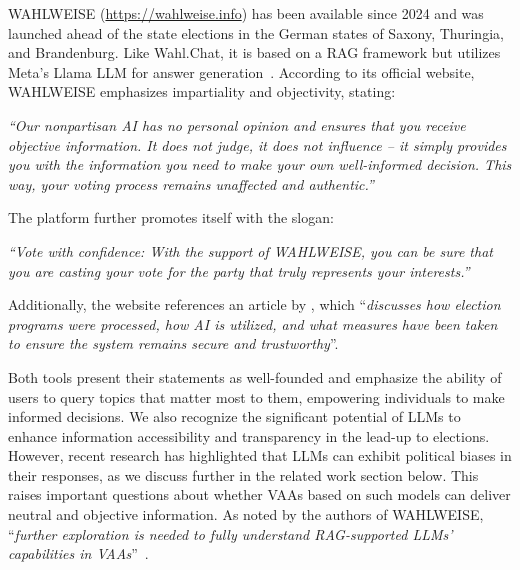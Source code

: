 \documentclass[
	fontsize=10pt,          %
	numbers=noenddot,    	%
    parskip=half,        	%
    listof=totoc,        	%
    bibliography=totoc,  	%
	headsepline=true,       %
	footsepline=false, 		%
    DIV=12                	%
]{scrartcl}
\begin{document}
WAHLWEISE (\url{https://wahlweise.info}\nocite{wahlweise2025}) has been available since 2024 and was launched ahead of the state elections in the German states of Saxony, Thuringia, and Brandenburg.
Like Wahl.Chat, it is based on a RAG framework but utilizes Meta's Llama LLM for answer generation~\citep{schiele2024voting}. 
According to its official website, WAHLWEISE emphasizes impartiality and objectivity, stating:
\begin{displayquote}
    \itshape
    ``Our nonpartisan AI has no personal opinion and ensures that you receive objective information. It does not judge, it does not influence -- it simply provides you with the information you need to make your own well-informed decision. This way, your voting process remains unaffected and authentic.''
\end{displayquote}    
The platform further promotes itself with the slogan:
\begin{displayquote}
    \itshape
    ``Vote with confidence: With the support of WAHLWEISE, you can be sure that you are casting your vote for the party that truly represents your interests.''
\end{displayquote} 
Additionally, the website references an article by \cite{schiele2024voting}, which
\enquote{\itshape discusses how election programs were processed, how AI is utilized, and what measures have been taken to ensure the system remains secure and trustworthy}.

Both tools present their statements as well-founded and emphasize the ability of users to query topics that matter most to them, empowering individuals to make informed decisions.
We also recognize the significant potential of LLMs to enhance information accessibility and transparency in the lead-up to elections.
However, recent research has highlighted that LLMs can exhibit political biases in their responses, as we discuss further in the related work section below.
This raises important questions about whether VAAs based on such models can deliver neutral and objective information.
As noted by the authors of WAHLWEISE,
\enquote{\itshape further exploration is needed to fully understand RAG-supported LLMs’ capabilities in VAAs}~\citep{schiele2024voting}.
\end{document}
